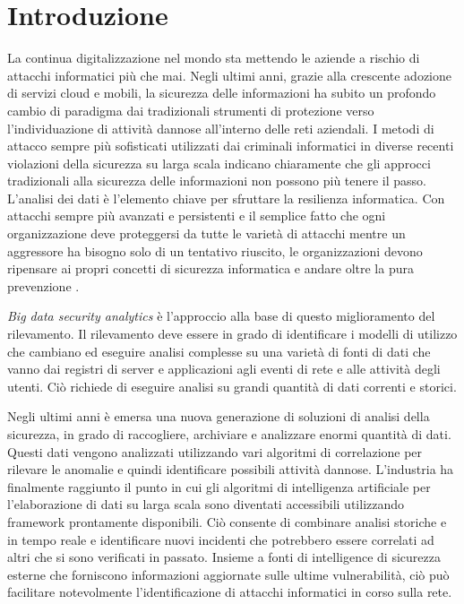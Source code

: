 \documentclass[../main.tex]{subfiles}
\begin{document}
\chapter{Introduzione}

La continua digitalizzazione nel mondo sta mettendo le aziende a rischio di attacchi informatici più che mai. Negli ultimi anni, grazie alla crescente adozione di servizi cloud e mobili, la sicurezza delle informazioni ha subito un profondo cambio di paradigma dai tradizionali strumenti di protezione verso l'individuazione di attività dannose all'interno delle reti aziendali.
I metodi di attacco sempre più sofisticati utilizzati dai criminali informatici in diverse recenti violazioni della sicurezza su larga scala indicano chiaramente che gli approcci tradizionali alla sicurezza delle informazioni non possono più tenere il passo. 
L'analisi dei dati è l'elemento chiave per sfruttare la resilienza informatica. Con attacchi sempre più avanzati e persistenti e il semplice fatto che ogni organizzazione deve proteggersi da tutte le varietà di attacchi mentre un aggressore ha bisogno solo di un tentativo riuscito, le organizzazioni devono ripensare ai propri concetti di sicurezza informatica e andare oltre la pura prevenzione \cite{bigdata}.

\textit{Big data security analytics} è l'approccio alla base di questo miglioramento del rilevamento. Il rilevamento deve essere in grado di identificare i modelli di utilizzo che cambiano ed eseguire analisi complesse su una varietà di fonti di dati che vanno dai registri di server e applicazioni agli eventi di rete e alle attività degli utenti.
Ciò richiede di eseguire analisi su grandi quantità di dati correnti e storici.

Negli ultimi anni è emersa una nuova generazione di soluzioni di analisi della sicurezza, in grado di raccogliere, archiviare e analizzare enormi quantità di dati. Questi dati vengono analizzati utilizzando vari algoritmi di correlazione per rilevare le anomalie e quindi identificare possibili attività dannose.
L'industria ha finalmente raggiunto il punto in cui gli algoritmi di intelligenza artificiale per l'elaborazione di dati su larga scala sono diventati accessibili utilizzando framework prontamente disponibili.
Ciò consente di combinare analisi storiche e in tempo reale e identificare nuovi incidenti che potrebbero essere correlati ad altri che si sono verificati in passato. Insieme a fonti di intelligence di sicurezza esterne che forniscono informazioni aggiornate sulle ultime vulnerabilità, ciò può facilitare notevolmente l'identificazione di attacchi informatici in corso sulla rete.
\end{document}
